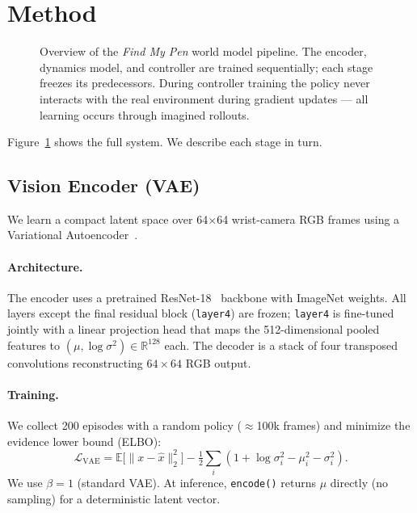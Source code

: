 \documentclass{article}
\begin{document}
\section{Method}

\begin{figure}[t]
  \centering
  \caption{
    Overview of the \emph{Find My Pen} world model pipeline.
    The encoder, dynamics model, and controller are trained sequentially;
    each stage freezes its predecessors.
    During controller training the policy never interacts with the real environment
    during gradient updates — all learning occurs through imagined rollouts.
  }
  \label{fig:pipeline}
\end{figure}

Figure~\ref{fig:pipeline} shows the full system. We describe each stage in turn.

\subsection{Vision Encoder (VAE)}

We learn a compact latent space over 64$\times$64 wrist-camera RGB frames using a
Variational Autoencoder~\cite{kingma2014vae}.

\paragraph{Architecture.}
The encoder uses a pretrained ResNet-18~\cite{he2016resnet} backbone with ImageNet weights.
All layers except the final residual block (\texttt{layer4}) are frozen; \texttt{layer4}
is fine-tuned jointly with a linear projection head that maps the 512-dimensional
pooled features to $(\mu, \log\sigma^2) \in \mathbb{R}^{128}$ each.
The decoder is a stack of four transposed convolutions reconstructing $64\times64$ RGB output.

\paragraph{Training.}
We collect 200 episodes with a random policy ($\approx$100k frames) and minimize the
evidence lower bound (ELBO):
\begin{equation}
  \mathcal{L}_\text{VAE} = \mathbb{E}\bigl[\|x - \hat{x}\|_2^2\bigr]
  - \tfrac{1}{2}\sum_i(1 + \log\sigma_i^2 - \mu_i^2 - \sigma_i^2).
\end{equation}
We use $\beta=1$ (standard VAE). At inference, \texttt{encode()} returns $\mu$ directly
(no sampling) for a deterministic latent vector.
\end{document}
